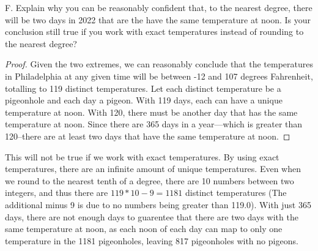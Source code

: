 \documentclass[article, 12pt]{article}
\theoremstyle{definition}
\begin{document}
\begin{enumerate}[(1)]
{        F. Explain why you can be reasonably confident that, to the nearest degree, there will be
        two days in 2022 that are the have the same temperature at noon. Is your conclusion still
        true if you work with exact temperatures instead of rounding to the nearest degree?}
        \begin{proof}
            Given the two extremes, we can reasonably conclude that the temperatures in Philadelphia at any given time will be between -12 and 107 degrees Fahrenheit, totalling to 119 distinct temperatures. Let each distinct temperature be a pigeonhole and each day a pigeon. With 119 days, each can have a unique temperature at noon. With 120, there must be another day that has the same temperature at noon. Since there are 365 days in a year---which is greater than 120--there are at least two days that have the same temperature at noon.
        \end{proof}
        This will not be true if we work with exact temperatures. By using exact temperatures, there are an infinite amount of unique temperatures. Even when we round to the nearest tenth of a degree, there are 10 numbers between two integers, and thus there are $119*10-9=1181$ distinct temperatures (The additional minus 9 is due to no numbers being greater than 119.0). With just 365 days, there are not enough days to guarentee that there are two days with the same temperature at noon, as each noon of each day can map to only one temperature in the 1181 pigeonholes, leaving 817 pigeonholes with no pigeons.
    \end{enumerate}
\end{document}
